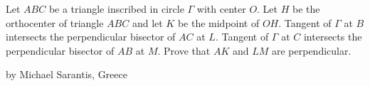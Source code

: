 Let $ABC$ be a triangle inscribed in circle $\Gamma$ with center $O$. Let $H$ be the orthocenter of triangle $ABC$ and let $K$ be the midpoint of $OH$. Tangent of $\Gamma$ at $B$ intersects the perpendicular bisector of $AC$ at $L$. Tangent of $\Gamma$ at $C$ intersects the perpendicular bisector of $AB$ at $M$. Prove that $AK$ and $LM$ are perpendicular.

by Michael Sarantis, Greece